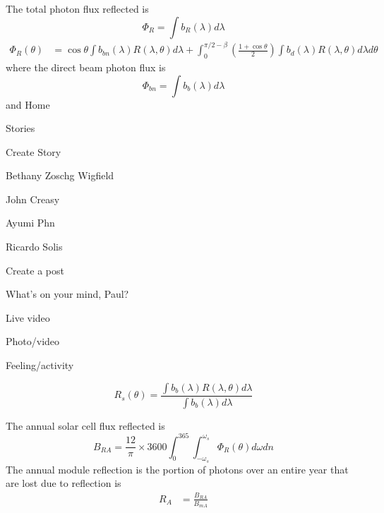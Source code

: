 \documentclass[preprint,12pt]{elsarticle}
\begin{document}
 
The total photon flux reflected is
\begin{equation}
\Phi_{R} = \int b_{R} (\lambda) d \lambda
\end{equation}
\begin{align}
\Phi_{R} (\theta) &= \cos \theta \int b_{bn} (\lambda) R(\lambda, \theta) d \lambda  +  \int_{0}^{\pi/2 - \beta} \left ( \frac{1 + \cos \theta}{2} \right ) \int b_d (\lambda) R(\lambda, \theta) d \lambda d \theta
\end{align}
where the direct beam photon flux is 
\begin{equation}
\Phi_{bn} = \int b_b (\lambda) d \lambda
\end{equation}
and Home

Stories



Create Story


Bethany Zoschg Wigfield



John Creasy



Ayumi Phn



Ricardo Solis




Create a post



What's on your mind, Paul?


Live video


Photo/video


Feeling/activity





\begin{equation}
R_s (\theta) = \frac{ \int b_b (\lambda) R(\lambda, \theta) d \lambda }{ \int b_b (\lambda) d \lambda}
\end{equation}

The annual solar cell flux reflected is 
\begin{equation}
B_{RA} = \frac{12}{\pi} \times 3600 \int_{0}^{365} \int_{-\omega_s} ^{\omega_s} \Phi_{R} (\theta) d \omega d n 
\end{equation}
The annual module reflection is the portion of photons over an entire year that are lost due to 
reflection is 
\begin{align}
R_{A} &= \frac{B_{RA}}{B_{mA}} \\
\end{align}
\end{document}
